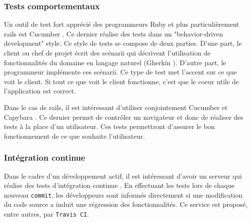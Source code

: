 \subsubsection{Tests comportementaux}
\label{cucumber}
Un outil de test fort apprécié des programmeurs Ruby et plus particulièrement \gls{rails} est Cucumber \cite{cucumber}. Ce dernier réalise des tests dans un "behavior-driven development" \cite{wiki-bdd} style. Ce style de tests se compose de deux parties. D'une part, le client ou chef de projet écrit des scénarii qui décrivent l'utilisation de fonctionnalités du domaine en langage naturel (Gherkin \cite{gherkin}). D'autre part, le programmeur implémente ces scénarii. Ce type de test met l'accent sur ce que voit le client. Si tout ce que voit le client fonctionne, c'est que le coeur utile de l'application est correct.

Dans le cas de \gls{rails}, il est intéressant d'utiliser conjointement Cucumber et Capybara \cite{capybara}. Ce dernier permet de contrôler un navigateur et donc de réaliser des tests à la place d'un utilisateur. Ces tests permettront d'assurer le bon fonctionnement de ce que souhaite l'utilisateur.

\subsubsection{Intégration continue}
\label{travis}
Dans le cadre d'un développement actif, il est intéressant d'avoir un serveur qui réalise des tests d'intégration continue \cite{wiki-int-cont}. En effectuant les tests lors de chaque nouveau \texttt{commit}, les développeurs sont informés directement si une modification du code source a induit une régression des fonctionnalités. Ce service est proposé, entre autres, par \texttt{Travis CI}\cite{travis}.
